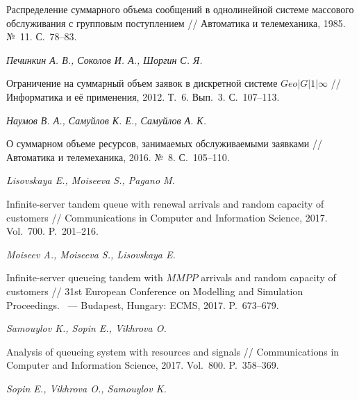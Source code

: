 \documentclass[a4paper,12pt]{article}
\begin{document}
\begin{enumerate}
Распределение суммарного объема сообщений в однолинейной системе массового обслуживания с групповым поступлением // {Автоматика и телемеханика}, 1985. №~11. С.~78--83.





\textit{Печинкин А. В., Соколов И. А., Шоргин С. Я.}

Ограничение на суммарный объем заявок в дискретной системе $Geo|G|1|\infty$ // {Информатика и её применения}, 2012. Т.~6. Вып.~3. С.~107--113.





\textit{Наумов В. А., Самуйлов К. Е., Самуйлов А. К.}

О суммарном объеме ресурсов, занимаемых обслуживаемыми заявками // {Автоматика и телемеханика}, 2016. №~8. С.~105--110.





\textit{Lisovskaya E., Moiseeva S., Pagano M.}

Infinite-server tandem queue with renewal arrivals and random capacity of customers // {Communications in Computer and Information Science}, 2017. Vol.~700. P.~201--216.





\textit{Moiseev A., Moiseeva S., Lisovskaya E.}

Infinite-server queueing tandem with $MMPP$ arrivals and random capacity of customers // {31st European Conference on Modelling and Simulation Proceedings}. ~--- Budapest, Hungary: ECMS, 2017. P.~673--679.





\textit{Samouylov K., Sopin E., Vikhrova O.}

Analysis of queueing system with resources and signals // {Communications in Computer and Information Science}, 2017. Vol.~800. P.~358--369.





\textit{Sopin E., Vikhrova O., Samouylov K.}


\end{enumerate}
\end{document}
